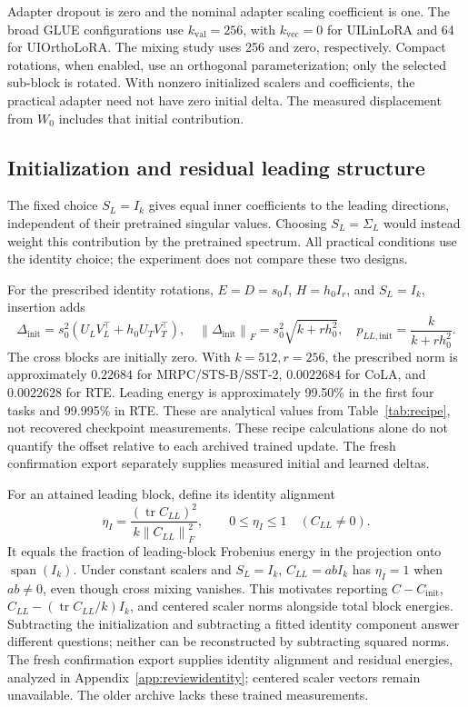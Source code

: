 \documentclass{article}
\newcommand{\fro}[1]{\left\|#1\right\|_F}
\begin{document}
Adapter dropout is zero and the nominal adapter scaling coefficient is one. The broad GLUE configurations use $k_{\mathrm{val}}=256$, with $k_{\mathrm{vec}}=0$ for UILinLoRA and 64 for UIOrthoLoRA. The mixing study uses 256 and zero, respectively. Compact rotations, when enabled, use an orthogonal parameterization; only the selected sub-block is rotated. With nonzero initialized scalers and coefficients, the practical adapter need not have zero initial delta. The measured displacement from $W_0$ includes that initial contribution.

\subsection{Initialization and residual leading structure}
\label{app:offset}
The fixed choice $S_L=I_k$ gives equal inner coefficients to the leading directions, independent of their pretrained singular values. Choosing $S_L=\Sigma_L$ would instead weight this contribution by the pretrained spectrum. All practical conditions use the identity choice; the experiment does not compare these two designs.

For the prescribed identity rotations, $E=D=s_0I$, $H=h_0I_r$, and $S_L=I_k$, insertion adds
\begin{equation}
\Delta_{\mathrm{init}}=s_0^2(U_LV_L^\top+h_0U_TV_T^\top),\quad
\fro{\Delta_{\mathrm{init}}}=s_0^2\sqrt{k+rh_0^2},\quad
p_{LL,\mathrm{init}}=\frac{k}{k+rh_0^2}.
\label{eq:initoffset}
\end{equation}
The cross blocks are initially zero. With $k=512,r=256$, the prescribed norm is approximately $0.22684$ for MRPC/STS-B/SST-2, $0.0022684$ for CoLA, and $0.0022628$ for RTE. Leading energy is approximately 99.50\% in the first four tasks and 99.995\% in RTE. These are analytical values from Table~\ref{tab:recipe}, not recovered checkpoint measurements. These recipe calculations alone do not quantify the offset relative to each archived trained update. The fresh confirmation export separately supplies measured initial and learned deltas.

For an attained leading block, define its identity alignment
\begin{equation}
\eta_I=\frac{(\operatorname{tr}C_{LL})^2}{k\fro{C_{LL}}^2},\qquad
0\le\eta_I\le1\quad(C_{LL}\ne0).
\label{eq:identityalignment}
\end{equation}
It equals the fraction of leading-block Frobenius energy in the projection onto $\operatorname{span}(I_k)$. Under constant scalers and $S_L=I_k$, $C_{LL}=abI_k$ has $\eta_I=1$ when $ab\ne0$, even though cross mixing vanishes. This motivates reporting $C-C_{\mathrm{init}}$, $C_{LL}-(\operatorname{tr}C_{LL}/k)I_k$, and centered scaler norms alongside total block energies. Subtracting the initialization and subtracting a fitted identity component answer different questions; neither can be reconstructed by subtracting squared norms. The fresh confirmation export supplies identity alignment and residual energies, analyzed in Appendix~\ref{app:reviewidentity}; centered scaler vectors remain unavailable. The older archive lacks these trained measurements.
\end{document}
